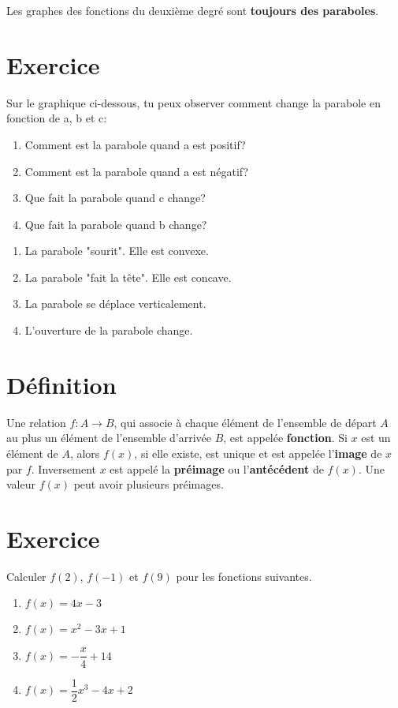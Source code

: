 \documentclass[a4paper,11pt]{article}
\begin{document}
Les graphes des fonctions du deuxième degré sont \textbf{toujours des paraboles}.

\section{Exercice}
Sur le graphique ci-dessous, tu peux observer comment change la parabole en fonction de a, b et c:\par
{}
\begin{enumerate}
    \item Comment est la parabole quand a est positif?
    \item Comment est la parabole quand a est négatif?
    \item Que fait la parabole quand c change?
    \item Que fait la parabole quand b change?
\end{enumerate}

\begin{solution}
\begin{enumerate}
    \item La parabole "sourit". Elle est convexe.
    \item La parabole "fait la tête". Elle est concave.
    \item La parabole se déplace verticalement.
    \item L'ouverture de la parabole change.
\end{enumerate}
\end{solution}

\section{Définition}
Une relation $f: A \longrightarrow B$, qui associe à chaque élément de l'ensemble de départ $A$ au plus un élément de l'ensemble d'arrivée $B$, est appelée \textbf{fonction}.
Si $x$ est un élément de $A$, alors $f(x)$, si elle existe, est unique et est appelée l'\textbf{image} de $x$ par $f$.
Inversement $x$ est appelé la \textbf{préimage} ou l'\textbf{antécédent} de $f(x)$.
Une valeur $f(x)$ peut avoir plusieurs préimages.

\section{Exercice}
Calculer $f(2)$, $f(-1)$ et $f(9)$ pour les fonctions suivantes.
\begin{multicols}{2}
\begin{enumerate}
\item $f(x)=4x-3$
\item $f(x)=x^2-3x+1$
\item $f(x)=-\dfrac{x}{4}+14$
\item $f(x)=\dfrac{1}{2}x^3-4x+2$
\end{enumerate}
\end{multicols}
\end{document}
